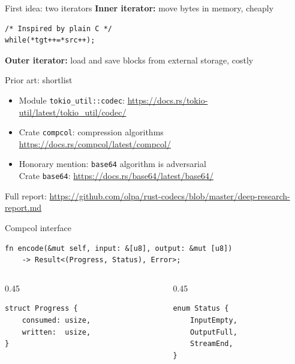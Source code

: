 \documentclass[aspectratio=169,11pt]{beamer}
\begin{document}
\begin{frame}[fragile]{First idea: two iterators}
\textbf{Inner iterator:} move bytes in memory, cheaply

\medskip
\begin{Verbatim}[frame=single,fontsize=\small]
/* Inspired by plain C */
while(*tgt++=*src++);
\end{Verbatim}

\medskip
\textbf{Outer iterator:} load and save blocks from external storage, costly
\end{frame}

\begin{frame}{Prior art: shortlist}
\begin{itemize}
\item Module \texttt{tokio\_util::codec}: \url{https://docs.rs/tokio-util/latest/tokio_util/codec/}
\item Crate \texttt{compcol}: compression algorithms\\
  \url{https://docs.rs/compcol/latest/compcol/}
\item Honorary mention: \texttt{base64} algorithm is adversarial\\
  Crate \texttt{base64}: \url{https://docs.rs/base64/latest/base64/}
\end{itemize}

\bigskip
Full report: \small\url{https://github.com/olpa/rust-codecs/blob/master/deep-research-report.md}
\end{frame}

\begin{frame}[fragile]{Compcol interface}
\begin{Verbatim}[fontsize=\Large,frame=single]
fn encode(&mut self, input: &[u8], output: &mut [u8])
    -> Result<(Progress, Status), Error>;
\end{Verbatim}

\medskip
\begin{columns}[t]
\begin{column}{0.45\textwidth}
\begin{Verbatim}[fontsize=\Large,frame=single]
struct Progress {
    consumed: usize,
    written:  usize,
}
\end{Verbatim}
\end{column}
\begin{column}{0.45\textwidth}
\begin{Verbatim}[fontsize=\Large,frame=single]
enum Status {
    InputEmpty,
    OutputFull,
    StreamEnd,
}
\end{Verbatim}
\end{column}
\end{columns}
\end{frame}
\end{document}
